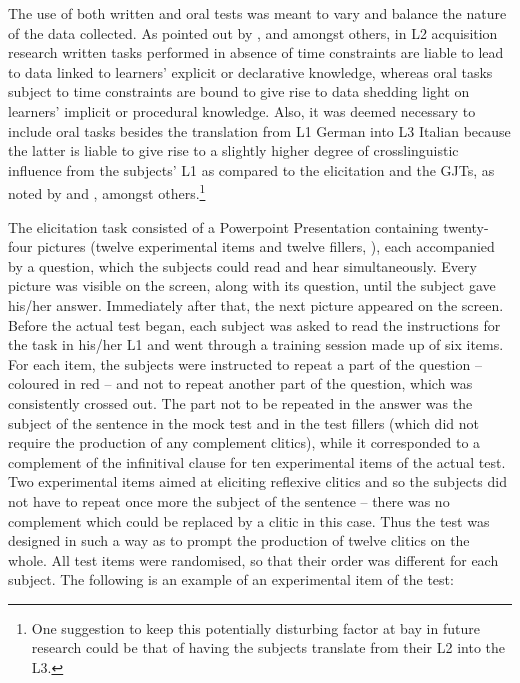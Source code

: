 \documentclass[output=paper,modfonts,nonflat,newtxmath]{langsci/langscibook}
\begin{document}
The use of both written and oral tests was meant to vary and balance the nature of the data collected. As pointed out by \citet{BialystokRyan1985}, \citet{Montrul2009} and \citet{EllisR2005} amongst others, in L2 acquisition research written tasks performed in absence of time constraints are liable to lead to data linked to learners’ explicit or declarative knowledge, whereas oral tasks subject to time constraints are bound to give rise to data shedding light on learners’ implicit or procedural knowledge. Also, it was deemed necessary to include oral tasks besides the translation from L1 German into L3 Italian because the latter is liable to give rise to a slightly higher degree of crosslinguistic influence from the subjects’ L1 as compared to the elicitation and the GJTs, as noted by \citet{BennatiDiDomenico2008} and \citet{Tytus2019}, amongst others.\footnote{ \textrm{One suggestion to keep this potentially disturbing factor at bay in future research could be that of having the subjects translate from their L2 into the L3.} }


The elicitation task consisted of a Powerpoint Presentation containing twenty-four pictures (twelve experimental items and twelve fillers, ), each accompanied by a question, which the subjects could read and hear simultaneously. Every picture was visible on the screen, along with its question, until the subject gave his/her answer. Immediately after that, the next picture appeared on the screen. Before the actual test began, each subject was asked to read the instructions for the task in his/her L1 and went through a training session made up of six items. For each item, the subjects were instructed to repeat a part of the question – coloured in red – and not to repeat another part of the question, which was consistently crossed out. The part not to be repeated in the answer was the subject of the sentence in the mock test and in the test fillers (which did not require the production of any complement clitics), while it corresponded to a complement of the infinitival clause for ten experimental items of the actual test. Two experimental items aimed at eliciting reflexive clitics and so the subjects did not have to repeat once more the subject of the sentence – there was no complement which could be replaced by a clitic in this case. Thus the test was designed in such a way as to prompt the production of twelve clitics on the whole. All test items were randomised, so that their order was different for each subject. The following is an example of an experimental item of the test:
\end{document}
